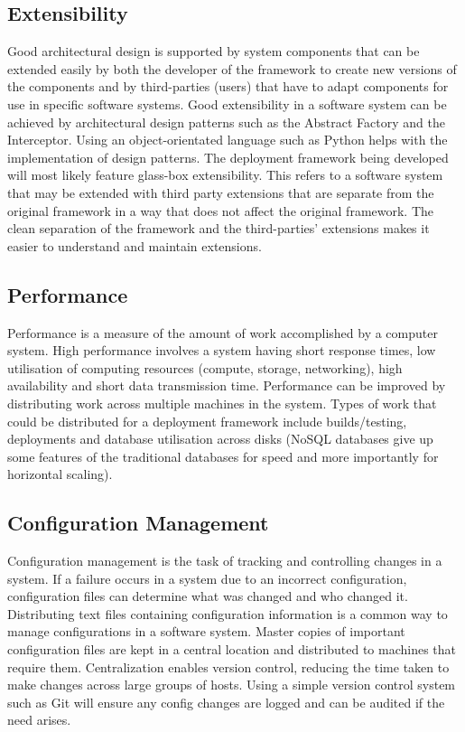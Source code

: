 \subsection{Extensibility}
Good architectural design is supported by system components that can be extended easily by both the developer of the framework to create new versions of the components and by third-parties (users) that have to adapt components for use in specific software systems. Good extensibility in a software system can be achieved by architectural design patterns such as the Abstract Factory and the Interceptor. Using an object-orientated language such as Python helps with the implementation of design patterns. The deployment framework being developed will most likely feature glass-box extensibility. This refers to a software system that may be extended with third party extensions that are separate from the original framework in a way that does not affect the original framework. The clean separation of the framework and the third-parties' extensions makes it easier to understand and maintain extensions. \cite{glassbox}

\subsection{Performance}
Performance is a measure of the amount of work accomplished by a computer system. High performance involves a system having short response times, low utilisation of computing resources (compute, storage, networking), high availability and short data transmission time. Performance can be improved by distributing work across multiple machines in the system. Types of work that could be distributed for a deployment framework include builds/testing, deployments and database utilisation across disks (NoSQL databases give up some features of the traditional databases for speed and more importantly for horizontal scaling).

\subsection{Configuration Management}
Configuration management is the task of tracking and controlling changes in a system. If a failure occurs in a system due to an incorrect configuration, configuration files can determine what was changed and who changed it. Distributing text files containing configuration information is a common way to manage configurations in a software system. Master copies of important configuration files are kept in a central location and distributed to machines that require them. Centralization enables version control, reducing the time taken to make changes across large groups of hosts. Using a simple version control system such as Git will ensure any config changes are logged and can be audited if the need arises.

